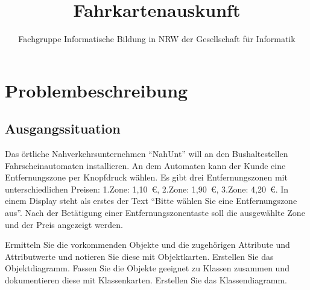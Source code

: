 \documentclass[12pt,a4paper]{scrartcl}
\author{Fachgruppe Informatische Bildung in NRW der Gesellschaft für Informatik}
\title{Fahrkartenauskunft}
\begin{document}
    \section*{Problembeschreibung}
    \subsection*{Ausgangssituation}
        Das örtliche Nahverkehrsunternehmen \enquote{NahUnt} will an den Bushaltestellen Fahrscheinautomaten installieren. An dem Automaten kann der Kunde eine Entfernungszone per Knopfdruck wählen. Es gibt drei Entfernungszonen mit unterschiedlichen Preisen: 1.Zone: 1,10~\euro, 2.Zone: 1,90~\euro, 3.Zone: 4,20~\euro. In einem Display steht als erstes der Text \enquote{Bitte wählen Sie eine Entfernungszone aus}. Nach der Betätigung einer Entfernungszonentaste soll die ausgewählte Zone und der Preis angezeigt werden.

        \begin{aufgabe}
            \begin{teilaufgaben}
                \teilaufgabe Ermitteln Sie die vorkommenden Objekte und die zugehörigen Attribute und Attributwerte und notieren Sie diese mit Objektkarten.
                \teilaufgabe Erstellen Sie das Objektdiagramm.
                \teilaufgabe Fassen Sie die Objekte geeignet zu Klassen zusammen und dokumentieren diese mit  Klassenkarten.
                \teilaufgabe Erstellen Sie das Klassendiagramm.
            \end{teilaufgaben}
        \end{aufgabe}
\end{document}
